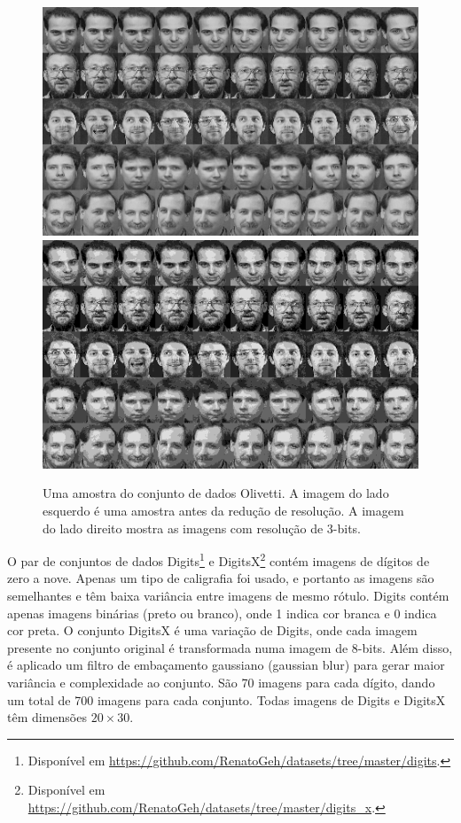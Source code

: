 \documentclass[12pt]{article}
\theoremstyle{plain}
\numberwithin{equation}{section}
\begin{document}
\begin{figure}[h]
  \centering\includegraphics[scale=0.5]{imgs/olivetti_sample.png}
  \includegraphics[scale=0.5]{imgs/olivetti-8_sample.png}
  \captionsetup{justification=raggedright}
  \caption{Uma amostra do conjunto de dados Olivetti. A imagem do lado esquerdo é uma amostra antes
    da redução de resolução. A imagem do lado direito mostra as imagens com resolução de 3-bits.}
\end{figure}

O par de conjuntos de dados
Digits\footnote{Disponível em \url{https://github.com/RenatoGeh/datasets/tree/master/digits}.} e
DigitsX\footnote{Disponível em \url{https://github.com/RenatoGeh/datasets/tree/master/digits_x}.}
contém imagens de dígitos de zero a nove. Apenas um tipo de caligrafia foi usado, e portanto as
imagens são semelhantes e têm baixa variância entre imagens de mesmo rótulo. Digits contém apenas
imagens binárias (preto ou branco), onde 1 indica cor branca e 0 indica cor preta. O conjunto
DigitsX é uma variação de Digits, onde cada imagem presente no conjunto original é transformada
numa imagem de 8-bits. Além disso, é aplicado um filtro de embaçamento gaussiano (gaussian blur)
para gerar maior variância e complexidade ao conjunto. São 70 imagens para cada dígito, dando um
total de 700 imagens para cada conjunto. Todas imagens de Digits e DigitsX têm dimensões $20\times
30$.
\end{document}
